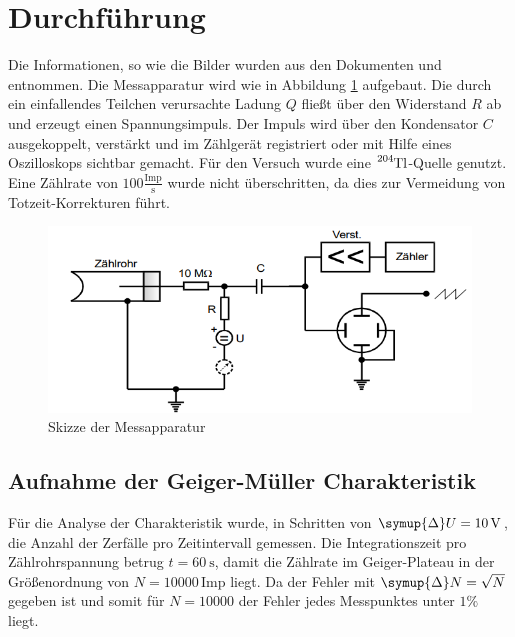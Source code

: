 \section{Durchführung}
\label{sec:Durchführung}
Die Informationen, so wie die Bilder wurden aus den Dokumenten \cite{v703} und \cite{hin} entnommen.
Die Messapparatur wird wie in Abbildung \ref{fig:Schalt} aufgebaut.
Die durch ein einfallendes Teilchen verursachte Ladung $Q$ fließt über den Widerstand $R$ ab und erzeugt einen Spannungsimpuls.
Der Impuls wird über den Kondensator $C$ ausgekoppelt, verstärkt und im Zählgerät registriert oder mit Hilfe eines Oszilloskops sichtbar gemacht.
Für den Versuch wurde eine $\ce{^{204}Tl}$-Quelle genutzt.
Eine Zählrate von $100 \frac{\text{Imp}}{\text{s}}$ wurde nicht überschritten, da dies zur Vermeidung von Totzeit-Korrekturen führt.
\begin{figure}
    \centering
    \includegraphics[scale=0.6]{pics/Schalt.png}
    \caption{Skizze der Messapparatur}
    \label{fig:Schalt}
  \end{figure}
\subsection{Aufnahme der Geiger-Müller Charakteristik}
Für die Analyse der Charakteristik wurde, in Schritten von $\symup{\Delta}U=\SI{10}{\volt}$, die Anzahl der Zerfälle pro Zeitintervall gemessen.
Die Integrationszeit pro Zählrohrspannung betrug $t=\SI{60}{\second}$, damit die Zählrate im Geiger-Plateau in der Größenordnung von $N=10000\,  \text{Imp}$ liegt.
Da der Fehler mit $\symup{\Delta}N=\sqrt{N}$ gegeben ist und somit für $N=10000$ der Fehler jedes Messpunktes unter $1\% $ liegt.
